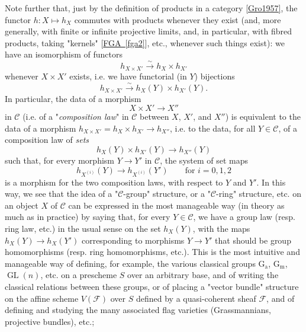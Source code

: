   Note further that, just by the definition of products in a category \hyperref[Gro1957]{[Gro1957]}, the functor \(h\colon  X\mapsto  h_X\) commutes with products whenever they exist (and, more generally, with finite or infinite projective limits, and, in particular, with fibred products, taking "kernels" [\hyperref[fga2]{FGA~\ref*{fga2}}], etc., whenever such things exist): we have an isomorphism of functors
  \[     h_{X\times  X'} \xrightarrow {\sim } h_X\times  h_{X'}   \]
  whenever \(X\times  X'\) exists, i.e. we have functorial (in \(Y\)) bijections
  \[     h_{X\times  X'} \xrightarrow {\sim } h_X(Y)\times  h_{X'}(Y).   \]
  In particular, the data of a morphism
  \[     X\times  X' \to  X''   \]
  in \(\mathcal {C}\) (i.e. of a "\emph{composition law}" in \(\mathcal {C}\) between \(X\), \(X'\), and \(X''\)) is equivalent to the data of a morphism \(h_{X\times  X'}=h_X\times  h_{X'}\to  h_{X''}\), i.e. to the data, for all \(Y\in \mathcal {C}\), of a composition law of \emph{sets}
  \[     h_X(Y)\times  h_{X'}(Y) \to  h_{X''}(Y)   \]
  such that, for every morphism \(Y\to  Y'\) in \(\mathcal {C}\), the system of set maps
  \[     h_{X^{(i)}}(Y) \to  h_{X^{(i)}}(Y')     \qquad \text {for }i=0,1,2   \]
  is a morphism for the two composition laws, with respect to \(Y\) and \(Y'\).
  In this way, we see that the idea of a "\(\mathcal {C}\)-group" structure, or a "\(\mathcal {C}\)-ring" structure, etc. on an object \(X\) of \(\mathcal {C}\) can be expressed in the most manageable way (in theory as much as in practice) by saying that, for every \(Y\in \mathcal {C}\), we have a group law (resp. ring law, etc.) in the usual sense on the set \(h_X(Y)\), with the maps \(h_X(Y)\to  h_X(Y')\) corresponding to morphisms \(Y\to  Y'\) that should be group homomorphisms (resp. ring homomorphisms, etc.).
  This is the most intuitive and manageable way of defining, for example, the various classical groups \(\operatorname {G_a}\), \(\operatorname {G_m}\), \(\operatorname {GL}(n)\), etc. on a prescheme \(S\) over an arbitrary base, and of writing the classical relations between these groups, or of placing a "vector bundle" structure on the affine scheme \(V(\mathscr {F})\) over \(S\) defined by a quasi-coherent sheaf \(\mathscr {F}\), and of defining and studying the many associated flag varieties (Grassmannians, projective bundles), etc.;
